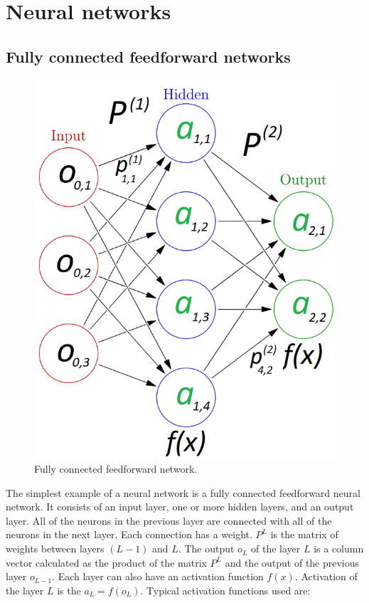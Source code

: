\section{Neural networks}


\subsection{Fully connected feedforward networks}

\begin{figure}[b!]
	\centering
	\includegraphics[totalheight=7cm]{pics/nn_1.png}
	\caption{Fully connected feedforward network.}
	\label{fig:nn1}
\end{figure}

The simplest example of a neural network is a fully connected feedforward neural network. It consists of an input layer, one or more hidden layers, and an output layer. All of the neurons in the previous layer are connected with all of the neurons in the next layer. Each connection has a weight. $ P^L $ is the matrix of weights between layers $ (L - 1) $ and $ L $. The output $ o_L $ of the layer $ L $ is a column vector calculated as the product of the matrix $ P^L $ and the output of the previous layer $ o_{L-1} $. Each layer can also have an activation function $ f(x) $. Activation of the layer $ L $ is the $ a_L = f(o_L) $. Typical activation functions used are:

